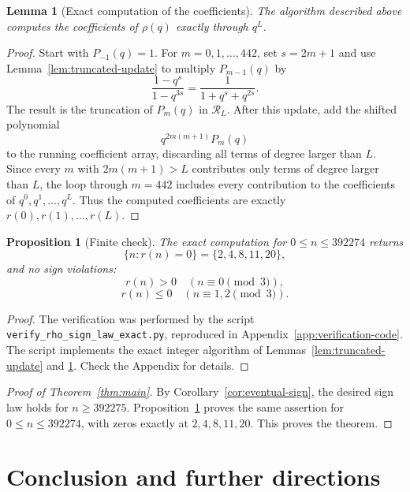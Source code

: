 \documentclass[11pt]{article}
\newtheorem{proposition}[theorem]{Proposition}
\newtheorem{lemma}[theorem]{Lemma}
\theoremstyle{remark}
\begin{document}
\begin{lemma}[Exact computation of the coefficients]\label{lem:exact-coeff-algorithm}
The algorithm described above computes the coefficients of $\rho(q)$ exactly
through $q^L$.
\end{lemma}

\begin{proof}
Start with $P_{-1}(q)=1$.  For $m=0,1,\ldots,442$, set $s=2m+1$ and use
Lemma~\ref{lem:truncated-update} to multiply $P_{m-1}(q)$ by
\[
\frac{1-q^s}{1-q^{3s}}
=\frac1{1+q^s+q^{2s}}.
\]
The result is the truncation of $P_m(q)$ in $\mathcal R_L$.  After this update,
add the shifted polynomial
\[
q^{2m(m+1)}P_m(q)
\]
to the running coefficient array, discarding all terms of degree larger than
$L$.  Since every $m$ with $2m(m+1)>L$ contributes only terms of degree larger
than $L$, the loop through $m=442$ includes every contribution to the
coefficients of $q^0,q^1,\ldots,q^L$.  Thus the computed coefficients are
exactly $r(0),r(1),\ldots,r(L)$.
\end{proof}

\begin{proposition}[Finite check]\label{prop:finite-check}
The exact computation for $0\leq n\leq392274$ returns
\[
\{n:r(n)=0\}=\{2,4,8,11,20\},
\]
and no sign violations:
\[
r(n)>0\quad(n\equiv0\pmod3),
\]
\[
r(n)\leq0\quad(n\equiv1,2\pmod3).
\]
\end{proposition}

\begin{proof}
The verification was performed by the script
\texttt{verify\_rho\_sign\_law\_exact.py}, reproduced in
Appendix~\ref{app:verification-code}.  The script implements the exact integer
algorithm of Lemmas~\ref{lem:truncated-update} and
\ref{lem:exact-coeff-algorithm}. 
Check the Appendix for details.

\end{proof}

\begin{proof}[Proof of Theorem~\ref{thm:main}]
By Corollary~\ref{cor:eventual-sign}, the desired sign law holds for
$n\geq392275$.  Proposition~\ref{prop:finite-check} proves the same assertion
for $0\leq n\leq392274$, with zeros exactly at $2,4,8,11,20$.  This proves the
theorem.
\end{proof}


\section{Conclusion and further directions}\label{sec:conclusion}
\end{document}
